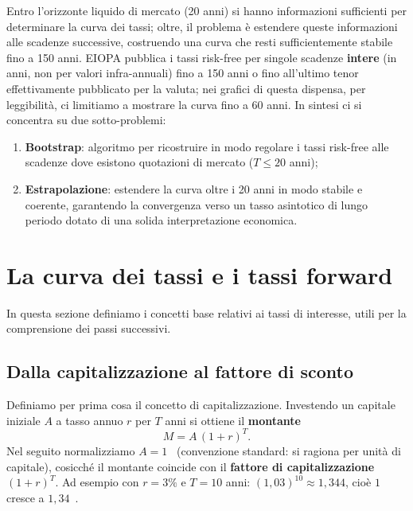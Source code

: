 \documentclass[11pt,a4paper]{article}
\theoremstyle{plain}
\theoremstyle{definition}
\theoremstyle{remark}
\begin{document}
Entro l'orizzonte liquido di mercato (20 anni) si hanno informazioni sufficienti per determinare
la curva dei tassi; oltre, il problema \`e estendere queste informazioni alle scadenze
successive, costruendo una curva che resti sufficientemente stabile fino a 150 anni. EIOPA
pubblica i tassi risk-free per singole scadenze \textbf{intere} (in anni, non per valori
infra-annuali) fino a 150 anni o fino all'ultimo tenor effettivamente pubblicato per la valuta;
nei grafici di questa dispensa, per leggibilit\`a, ci limitiamo a mostrare la curva fino a 60
anni. In sintesi ci si concentra su due sotto-problemi:
\begin{enumerate}
  \item \textbf{Bootstrap}: algoritmo per ricostruire in modo regolare i tassi risk-free alle scadenze dove
        esistono quotazioni di mercato ($T \le 20$ anni);
  \item \textbf{Estrapolazione}: estendere la curva oltre i 20 anni in modo stabile e
        coerente, garantendo la convergenza verso un tasso asintotico di lungo periodo dotato di una solida interpretazione economica.
\end{enumerate}

\section{La curva dei tassi e i tassi forward}

In questa sezione definiamo i concetti base relativi ai tassi di interesse, utili per la comprensione dei passi successivi.

\subsection{Dalla capitalizzazione al fattore di sconto}

Definiamo per prima cosa il concetto di capitalizzazione.
Investendo un capitale iniziale $A$ a tasso annuo $r$ per $T$ anni si ottiene il
\textbf{montante}
\begin{equation}
  M = A\,(1+r)^T.
  \label{eq:montante}
\end{equation}
Nel seguito normalizziamo $A = 1$~\texteuro{} (convenzione standard: si ragiona per
unit\`a di capitale), cosicch\'e il montante coincide con il \textbf{fattore di
capitalizzazione} $(1+r)^T$. Ad esempio con $r=3\%$ e $T=10$ anni:
$(1{,}03)^{10} \approx 1{,}344$, cio\`e $1$~\texteuro{} cresce a $1{,}34$~\texteuro{}.
\end{document}
